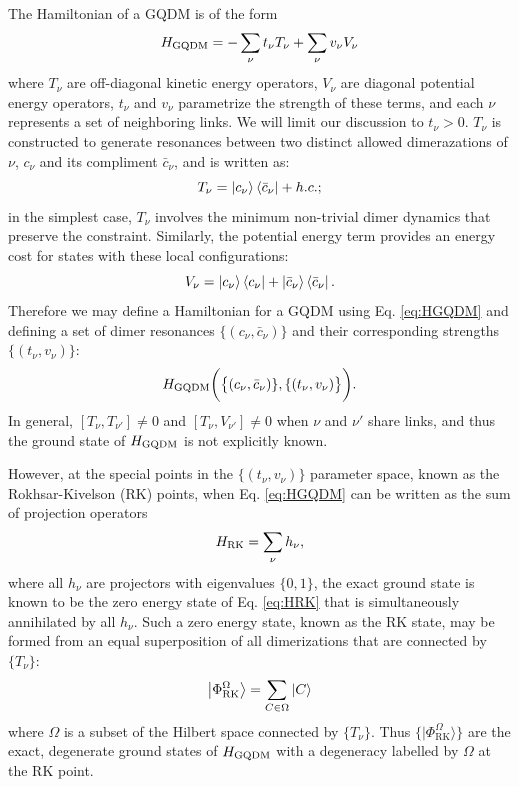 \documentclass[twocolumn,prb,aps,floatfix,superscriptaddress]{revtex4-1}
\newcommand{\ket}[1]{| #1 \rangle}
\newcommand{\eket}[1]{\left | #1 \right \rangle}
\newcommand{\ebra}[1]{\left \langle #1 \right |}
\newcommand{\Eqref}[1]{Eq. \eqref{#1}}
\newcommand{\RK}{\mathrm{RK}}
\newcommand{\HGQDM}{H_\mathrm{GQDM}}
\begin{document}
The Hamiltonian of a GQDM is of the form
\begin{equation}
H_{\rm{GQDM}} = -\sum_\nu t_\nu  {T}_{\nu} + \sum_\nu v_\nu  {V}_{\nu} \label{eq:HGQDM}
\end{equation}
where ${T}_\nu$ are off-diagonal kinetic energy operators, ${V}_\nu$ are diagonal potential energy operators, $t_\nu$ and $v_\nu$ parametrize the strength of these terms, and each $\nu$ represents a set of  neighboring links. We will limit our discussion to $t_\nu >0$. ${T}_\nu$ is constructed to generate resonances between two distinct allowed dimerazations of $\nu$, $c_\nu$ and its compliment $\bar{c}_\nu$, and is written as:
\begin{equation}
 {T}_{\nu} = \eket{c_\nu}\ebra{\bar{c}_\nu} + h.c.;  \notag
\end{equation}
in the simplest case, $ {T_\nu}$ involves the minimum non-trivial dimer dynamics that preserve the constraint. Similarly, the potential energy term provides an energy cost for states with these local configurations:
\begin{equation}
 {V}_{\nu} = \eket{c_\nu}\ebra{c_\nu} +  \eket{\bar{c}_\nu}\ebra{\bar{c}_\nu}.  \notag
\end{equation}
Therefore we may define a Hamiltonian for a GQDM using \Eqref{eq:HGQDM} and defining a set of dimer resonances $\{(c_\nu,\bar{c}_\nu)\}$ and their corresponding strengths $\{(t_\nu,v_\nu)\}$:
\begin{equation}
\HGQDM \biggl( \bigl\{\left(c_\nu,\bar{c}_\nu\right)\},\{\left(t_\nu,v_\nu\right)\bigr\}\biggr).  \notag
\end{equation}
 In general, $[T_\nu, T_{\nu'}] \neq 0 $ and $[T_\nu,V_{\nu'}]\neq0$ when $\nu$ and $\nu'$ share links, and thus the ground state of $H_{\rm{GQDM}}$ is not explicitly known.

However, at the special points in the $\{(t_\nu,v_\nu)\}$ parameter space, known as the Rokhsar-Kivelson (RK) points, when \Eqref{eq:HGQDM} can be written as the sum of projection operators
\begin{equation}
H_{\rm{RK}} = \sum_\nu  {h}_\nu \label{eq:HRK},
\end{equation}
where all $h_\nu$ are projectors with eigenvalues $\{0,1\}$, the exact ground state is known to be
the zero energy state of \Eqref{eq:HRK} that is simultaneously annihilated by all ${h}_\nu$. Such a zero energy state, known as the RK state, may be formed from an equal superposition of all dimerizations that are connected by $\{T_\nu\}$:
\begin{equation}
\eket{\Phi_{\RK}^{\Omega}} = \sum_{C \in \Omega} \eket{C}  \notag
\end{equation} 
where $\Omega$ is a subset of the Hilbert space connected by $\{T_\nu\}$. Thus $\{ \ket{\Phi_{\RK}^\Omega} \}$ are the exact, degenerate ground states of $H_{\rm{GQDM}}$ with a degeneracy labelled by $\Omega$ at the RK point.
\end{document}

